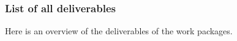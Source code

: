 \subsubsection*{List of all deliverables}\label{sec:deliverables}

Here is an overview of the deliverables 
of the work packages. 


{\footnotesize{}}

